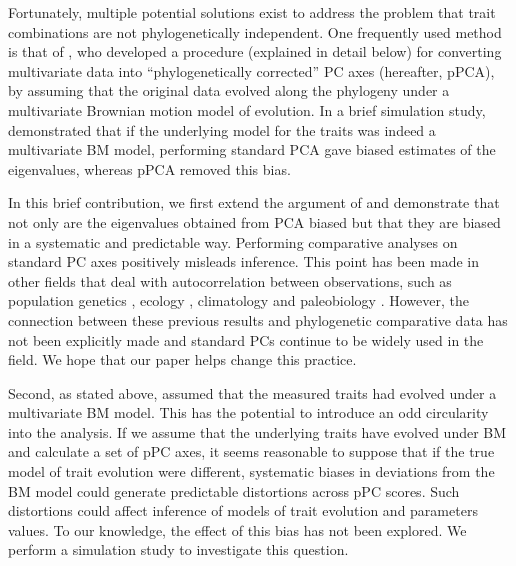 \documentclass[a4paper,12pt]{article}
\begin{document}
Fortunately, multiple potential solutions exist to address the problem that trait combinations are not phylogenetically independent.  One frequently used method is that of \citet{Revell2008}, who developed a procedure (explained in detail below) for converting multivariate data into ``phylogenetically corrected'' PC axes (hereafter, pPCA), by assuming that the original data evolved along the phylogeny under a multivariate Brownian motion \citep[BM;][]{Edwards1964, Felsenstein1973} model of evolution. In a brief simulation study, \citet{Revell2008} demonstrated that if the underlying model for the traits was indeed a multivariate BM model, performing standard PCA gave biased estimates of the eigenvalues, whereas pPCA removed this bias.

In this brief contribution, we first extend the argument of \citet{Revell2008} and demonstrate that not only are the eigenvalues obtained from PCA biased but that they are biased in a systematic and predictable way. Performing comparative analyses on standard PC axes positively misleads inference. This point has been made in other fields that deal with autocorrelation between observations, such as population genetics \citep{Novembre}, ecology \citep{Podani2002}, climatology \citep{Richman1986} and paleobiology \citep{Bookstein2012}. However, the connection between these previous results and phylogenetic comparative data has not been explicitly made and standard PCs continue to be widely used in the field. We hope that our paper helps change this practice.

Second, as stated above, \citet{Revell2008} assumed that the measured traits had evolved under a multivariate BM model. This has the potential to introduce an odd circularity into the analysis. If we assume that the underlying traits have evolved under BM and calculate a set of pPC axes, it seems reasonable to suppose that if the true model of trait evolution were different, systematic biases in deviations from the BM model could generate predictable distortions across pPC scores. Such distortions could affect inference of models of trait evolution and parameters values. To our knowledge, the effect of this bias has not been explored. We perform a simulation study to investigate this question.
\end{document}
